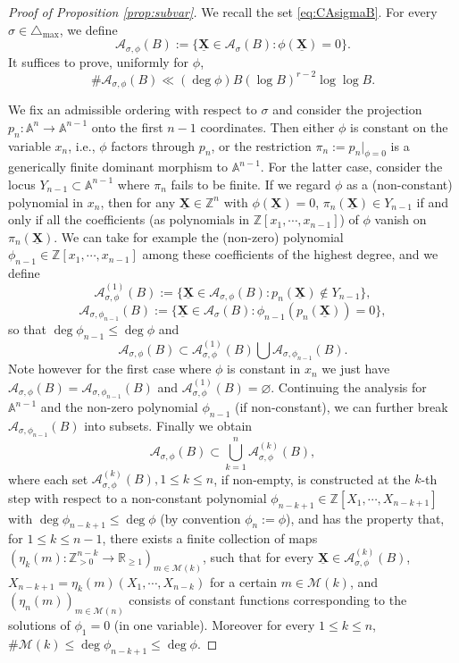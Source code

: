 \documentclass[10pt,a4paper]{amsart}
\newcommand{\BA}{{\mathbb {A}}}
\newcommand{\BR}{{\mathbb {R}}}
\newcommand{\BZ}{{\mathbb {Z}}}
\newcommand{\CA}{{\mathcal {A}}}
\newcommand{\CM}{{\mathcal {M}}}
\newcommand{\XX}{\underline{\mathbf{X}}}
\begin{document}
\begin{proof}[Proof of Proposition \ref{prop:subvar}]
	We recall the set  \eqref{eq:CAsigmaB}. For every $\sigma\in\triangle_{\max}$, we define $$\CA_{\sigma,\phi}(B):=\{\XX\in\CA_\sigma(B): \phi(\XX)=0\}.$$ It suffices to prove,  uniformly for $\phi$, 
\begin{equation}\label{eq:CAsigmaphi}
	\#\CA_{\sigma,\phi}(B)\ll (\deg \phi)B(\log B)^{r-2}\log\log B.
\end{equation}

	We fix an admissible ordering with respect to $\sigma$ and consider the projection $p_n:\BA^n\to\BA^{n-1}$ onto the first $n-1$ coordinates. Then either $\phi$ is constant on the variable $x_{n}$, i.e., $\phi$ factors through $p_n$, or the restriction $\pi_n:=p_n|_{\phi=0}$ is a generically finite dominant morphism to $\BA^{n-1}$. For the latter case, consider the locus $Y_{n-1}\subset\BA^{n-1}$ where $\pi_n$ fails to be finite. If we regard $\phi$ as a (non-constant) polynomial in $x_n$, then for any $\XX\in\BZ^n$ with $\phi(\XX)=0$, $\pi_n(\XX)\in Y_{n-1}$ if and only if all the coefficients (as polynomials in $\BZ[x_1,\cdots,x_{n-1}]$) of $\phi$ vanish on $\pi_n(\XX)$. We can take for example the (non-zero) polynomial $\phi_{n-1}\in\BZ[x_1,\cdots,x_{n-1}]$ among these coefficients of the highest degree, and we define
	$$\CA_{\sigma,\phi}^{(1)}(B):=\{\XX\in\CA_{\sigma,\phi}(B):p_n(\XX)\not\in Y_{n-1}\},$$
	$$\CA_{\sigma,\phi_{n-1}}(B):=\{\XX\in\CA_\sigma(B):\phi_{n-1}(p_n(\XX))=0\},$$
	so that $\deg\phi_{n-1}\leqslant \deg\phi$ and $$\CA_{\sigma,\phi}(B)\subset\CA_{\sigma,\phi}^{(1)}(B)\bigcup \CA_{\sigma,\phi_{n-1}}(B).$$ Note however for the first case where $\phi$ is constant in $x_n$ we just have  $\CA_{\sigma,\phi}(B)=\CA_{\sigma,\phi_{n-1}}(B)$ and $\CA_{\sigma,\phi}^{(1)}(B)=\varnothing$.
	Continuing the analysis for $\BA^{n-1}$ and the non-zero polynomial $\phi_{n-1}$ (if non-constant), we can further break $\CA_{\sigma,\phi_{n-1}}(B)$ into subsets. Finally we obtain 
	\begin{equation}\label{eq:decompCABf}
		\CA_{\sigma,\phi}(B)\subset \bigcup_{k=1}^{n}\CA_{\sigma,\phi}^{(k)}(B),
	\end{equation}
	where each set $\CA_{\sigma,\phi}^{(k)}(B),1\leqslant k\leqslant n$, if non-empty, is constructed  at the $k$-th step with respect to a non-constant polynomial $\phi_{n-k+1}\in\BZ[X_1,\cdots,X_{n-k+1}]$ with $\deg \phi_{n-k+1}\leqslant \deg \phi$ (by convention $\phi_n:=\phi$), and has the property that,  for $1\leqslant k\leqslant n-1$, there exists a finite collection of maps $(\eta_{k}(m):\BZ_{>0}^{n-k}\to\BR_{\geqslant 1})_{m\in \CM(k)}$, such that for every $\XX\in\CA_{\sigma,\phi}^{(k)}(B)$,  $X_{n-k+1}=\eta_{k}(m)(X_1,\cdots,X_{n-k})$ for a certain $m\in \CM(k)$, and $(\eta_{n}(m))_{m\in\CM(n)}$ consists of constant functions corresponding to the solutions of $\phi_1=0$ (in one variable). Moreover for every $1\leqslant k\leqslant n$,  $\#\CM(k)\leqslant\deg \phi_{n-k+1}\leqslant\deg \phi$.
	

\end{proof}
\end{document}
